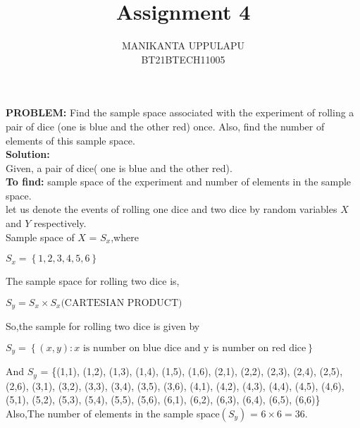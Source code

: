 \documentclass[journal,12pt,twocolumn]{IEEEtran}
\title{Assignment 4}
\author{MANIKANTA UPPULAPU\\BT21BTECH11005}
\date{}
\providecommand{\cbrak}[1]{\ensuremath{\left\{#1\right\}}}
\newcommand{\PROBLEM}{\noindent \textbf{PROBLEM: }}
\newcommand{\solution}{\noindent \textbf{Solution: }}
\newcommand{\tofind}{\noindent \textbf{To find: }}
\begin{document}
\maketitle
\PROBLEM Find the sample space associated with the experiment of rolling a pair of dice (one is blue and the other red) once. Also, find the number of elements of this sample space.\\

\solution \\
Given, a pair of dice( one is blue and the other red).\\

\tofind sample space of the experiment and number of elements in the sample space.\\

let us denote the events of rolling one dice and two dice by random variables $X$ and $Y$ respectively.\\
Sample space of $X$ = $S_x$,where\\
\begin{enumerate}[label=(\roman{enumi})]
	$S_x = \cbrak{1,2,3,4,5,6}$\\
\end{enumerate}
The sample space for rolling two dice is,\\
\begin{enumerate}[label=(\roman{enumi})]
	$S_y = S_x \times S_x \text{(CARTESIAN PRODUCT)}$
\end{enumerate}
So,the sample for rolling two dice is given by\\
\begin{enumerate}[label=(\roman{enumi})]
$S_y = \cbrak {(x,y) : x \text{ is number on blue dice and y is number on red dice} }$\\
\end{enumerate}
And $S_y$ = \{(1,1), (1,2), (1,3), (1,4), (1,5), (1,6), (2,1), (2,2), (2,3), (2,4), (2,5), (2,6), (3,1), (3,2), (3,3), (3,4), (3,5), (3,6), (4,1), (4,2), (4,3), (4,4), (4,5), (4,6), (5,1), (5,2), (5,3), (5,4), (5,5), (5,6), (6,1), (6,2), (6,3), (6,4), (6,5), (6,6)\}\\

Also,The number of elements in the sample space$(S_y)$ = $6 \times 6 = 36.$
\end{document}
